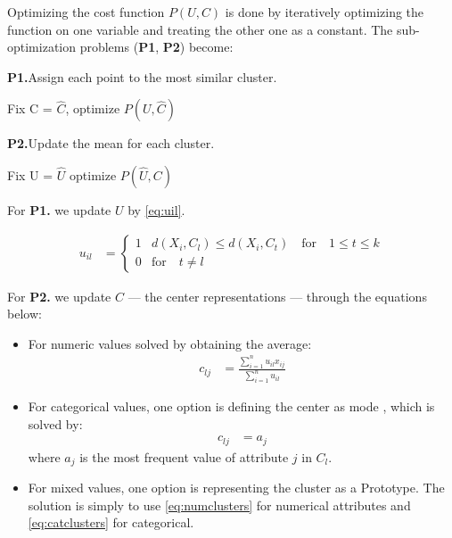 \documentclass[../report.tex]{subfiles}
\begin{document}
Optimizing the cost function $P(U,C)$ is done by iteratively optimizing the function on one variable and treating the other one as a constant. The sub-optimization problems (\textbf{P1}, \textbf{P2}) become:

\begin{description}
  \item \textbf{P1.}\quad Assign each point to the most similar cluster.
    \begin{description}
    	\item Fix C = $\hat{C}$, optimize $P(U, \hat{ C })$
    \end{description}

  \item \textbf{P2.}\quad Update the mean for each cluster.
    \begin{description}
		\item Fix U = $\hat{U}$ optimize $P(\hat{ U },C)$
    \end{description}
\end{description}

For \textbf{P1.} we update $U$ by \cref{eq:uil}.

\begin{align}
 \label{eq:uil}
  u_{il} &=
  \begin{cases}
  1 & d(X_i,C_l) \leq d(X_i,C_t) \quad \text{for} \quad 1 \leq t \leq k \\
  0 & \text{for} \quad t \neq l
  \end{cases}
\end{align}

For \textbf{P2.} we update $C$ --- the center representations --- through the equations below:

\begin{itemize}
    \item For numeric values solved by obtaining the average:
      \begin{align}
        \label{eq:numclusters}
        c_{lj} &= \frac{ \sum_{i = 1}^{n}{ u_{ il }x_{ ij }  }}{\sum_{i = 1}^{n}{ u_{ il }}}
      \end{align}
    \item For categorical values, one option is defining the center as mode \cite{Ng1999}, which is solved by:
      \begin{align}
        \label{eq:catclusters}
      c_{lj} &= a_{j}
      \end{align}
      where $a_{j}$ is the most frequent value of attribute $j$ in $C_l$.
    \item For mixed values, one option is representing the cluster as a Prototype\cite{Huang97clusteringlarge,Huang1998}. The solution is simply to use \cref{eq:numclusters} for numerical attributes and \cref{eq:catclusters} for categorical.
\end{itemize}
\end{document}
